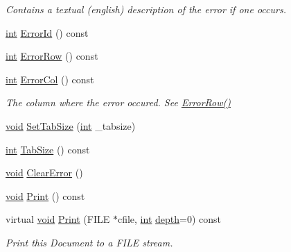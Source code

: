 \begin{DoxyCompactItemize}
\begin{DoxyCompactList}\small\item\em Contains a textual (english) description of the error if one occurs. \end{DoxyCompactList}\item 
\hyperlink{wglew_8h_a500a82aecba06f4550f6849b8099ca21}{int} \hyperlink{class_ti_xml_document_af96fc2f3f9ec6422782bfe916c9e778f}{Error\-Id} () const 
\item 
\hyperlink{wglew_8h_a500a82aecba06f4550f6849b8099ca21}{int} \hyperlink{class_ti_xml_document_af30efc75e804aa2e92fb8be3a8cb676e}{Error\-Row} () const 
\item 
\hyperlink{wglew_8h_a500a82aecba06f4550f6849b8099ca21}{int} \hyperlink{class_ti_xml_document_aa90bc630ee5203c6109ca5fad3323649}{Error\-Col} () const 
\begin{DoxyCompactList}\small\item\em The column where the error occured. See \hyperlink{class_ti_xml_document_af30efc75e804aa2e92fb8be3a8cb676e}{Error\-Row()} \end{DoxyCompactList}\item 
\hyperlink{wglew_8h_aeea6e3dfae3acf232096f57d2d57f084}{void} \hyperlink{class_ti_xml_document_a51dac56316f89b35bdb7d0d433ba988e}{Set\-Tab\-Size} (\hyperlink{wglew_8h_a500a82aecba06f4550f6849b8099ca21}{int} \-\_\-tabsize)
\item 
\hyperlink{wglew_8h_a500a82aecba06f4550f6849b8099ca21}{int} \hyperlink{class_ti_xml_document_a612360241b85bad0826b2a9ae9cda561}{Tab\-Size} () const 
\item 
\hyperlink{wglew_8h_aeea6e3dfae3acf232096f57d2d57f084}{void} \hyperlink{class_ti_xml_document_ac66b8c28db86363315712a3574e87c35}{Clear\-Error} ()
\item 
\hyperlink{wglew_8h_aeea6e3dfae3acf232096f57d2d57f084}{void} \hyperlink{class_ti_xml_document_af08389ec70ee9b2de7f800e206a18510}{Print} () const 
\item 
virtual \hyperlink{wglew_8h_aeea6e3dfae3acf232096f57d2d57f084}{void} \hyperlink{class_ti_xml_document_a8701fda1fa31b25abbc9c0df42da10e8}{Print} (F\-I\-L\-E $\ast$cfile, \hyperlink{wglew_8h_a500a82aecba06f4550f6849b8099ca21}{int} \hyperlink{glew_8h_a1c814629538debe12a7bfe2509a3671e}{depth}=0) const 
\begin{DoxyCompactList}\small\item\em Print this Document to a F\-I\-L\-E stream. \end{DoxyCompactList}\item 

\end{DoxyCompactItemize}
